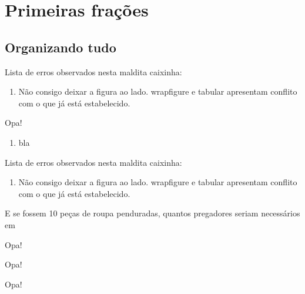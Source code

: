 \documentclass[a4,12pt]{book}
\begin{document}
\chapter{Primeiras frações}

\section{Organizando tudo}

\begin{refletindo}
  Lista de erros observados nesta maldita caixinha:
  \begin{enumerate}
   \item Não consigo deixar a figura ao lado. wrapfigure e tabular apresentam conflito com o que já está estabelecido. 
  \end{enumerate}
\end{refletindo}


\begin{refletindo}
 Opa!
 \begin{enumerate}
  \item bla
 \end{enumerate}
\end{refletindo}



\begin{refletindo}
Lista de erros observados nesta maldita caixinha:

\begin{enumerate}
 \item Não consigo deixar a figura ao lado. wrapfigure e tabular apresentam conflito com o que já está estabelecido.
\end{enumerate}
\end{refletindo}

E se fossem 10 peças de roupa penduradas, quantos pregadores seriam necessários em

\lipsum[1]

\begin{refletindo}
 Opa!
 \lipsum[1]
\end{refletindo}

\lipsum[2-4]

\begin{refletindo}
 Opa!
 \lipsum[5]
\end{refletindo}

\lipsum
\begin{refletindo}
 Opa!
 \lipsum[1]
\end{refletindo}

\lipsum[2-4]




\end{document}
